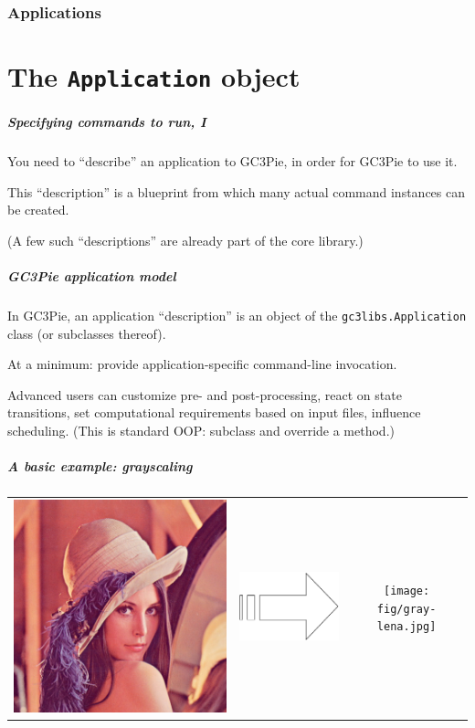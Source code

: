 \documentclass[english,serif,mathserif,xcolor=pdftex,dvipsnames,table]{beamer}
\begin{document}
\section{Applications}
\part{The \texttt{Application} object}

\begin{frame}
  \frametitle{Specifying commands to run, I}

  You need to ``describe'' an application to GC3Pie, in order for
  GC3Pie to use it.

  \+
  This ``description'' is a blueprint from which many actual
  command instances can be created.

  \+
  (A few such ``descriptions'' are already part of the core library.)
\end{frame}


\begin{frame}
  \frametitle{GC3Pie application model}

  In GC3Pie, an application ``description'' is an object of the
  \texttt{gc3libs.Application} class (or subclasses thereof).

  \+
  At a minimum: provide application-specific command-line invocation.

  \+
  Advanced users can customize pre- and post-processing, react on
  state transitions, set computational requirements based on input
  files, influence scheduling.  (This is standard OOP: subclass and
  override a method.)
\end{frame}


\begin{frame}[fragile]
\frametitle{A basic example: grayscaling}
\begin{tabular}{ccc}
  {\includegraphics[width=0.4\linewidth]{fig/lena.jpg}}
  &
  {\includegraphics[width=0.1\linewidth,totalheight=0.45\textheight]{fig/arrow.pdf}}
  &
  {\texttt{[image: fig/gray-lena.jpg]}}
\end{tabular}

\end{frame}
\end{document}
